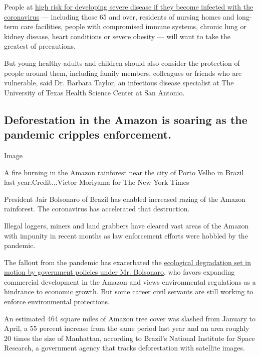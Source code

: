 People at
\href{https://www.cdc.gov/coronavirus/2019-ncov/need-extra-precautions/people-at-higher-risk.html}{high
risk for developing severe disease if they become infected with the
coronavirus} --- including those 65 and over, residents of nursing homes
and long-term care facilities, people with compromised immune systems,
chronic lung or kidney disease, heart conditions or severe obesity ---
will want to take the greatest of precautions.

But young healthy adults and children should also consider the
protection of people around them, including family members, colleagues
or friends who are vulnerable, said Dr. Barbara Taylor, an infectious
disease specialist at The University of Texas Health Science Center at
San Antonio.

\hypertarget{deforestation-in-the-amazon-is-soaring-as-the-pandemic-cripples-enforcement}{%
\subsection{Deforestation in the Amazon is soaring as the pandemic
cripples
enforcement.}\label{deforestation-in-the-amazon-is-soaring-as-the-pandemic-cripples-enforcement}}

Image

A fire burning in the Amazon rainforest near the city of Porto Velho in
Brazil last year.Credit...Victor Moriyama for The New York Times

President Jair Bolsonaro of Brazil has enabled increased razing of the
Amazon rainforest. The coronavirus has accelerated that destruction.

Illegal loggers, miners and land grabbers have cleared vast areas of the
Amazon with impunity in recent months as law enforcement efforts were
hobbled by the pandemic.

The fallout from the pandemic has exacerbated the
\href{https://www.nytimes3xbfgragh.onion/2020/04/19/world/americas/bolsonaro-brazil-amazon-indigenous.html}{ecological
degradation set in motion by government policies under Mr. Bolsonaro},
who favors expanding commercial development in the Amazon and views
environmental regulations as a hindrance to economic growth. But some
career civil servants are still working to enforce environmental
protections.

An estimated 464 square miles of Amazon tree cover was slashed from
January to April, a 55 percent increase from the same period last year
and an area roughly 20 times the size of Manhattan, according to
Brazil's National Institute for Space Research, a government agency that
tracks deforestation with satellite images.

